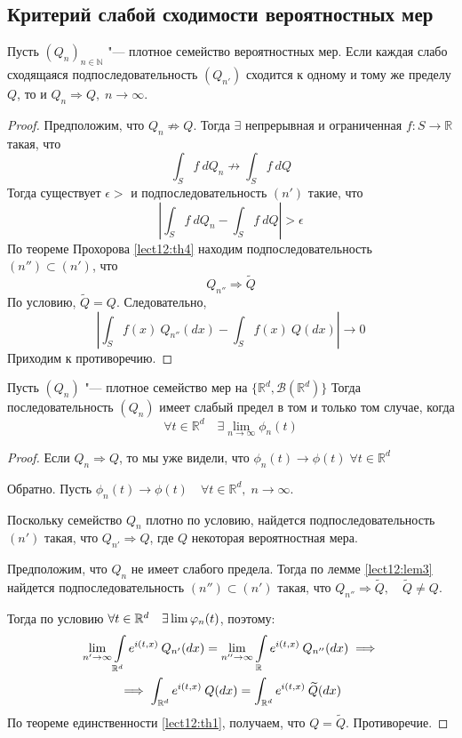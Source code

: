 \subsection{Критерий слабой сходимости вероятностных мер}
    \begin{lemma} \label{lect12:lem3}
        Пусть $(Q_n)_{n \in \mathbb{N}}$ "--- плотное семейство вероятностных мер. Если каждая слабо сходящаяся подпоследовательность $(Q_{n'})$ сходится к одному и тому же пределу $Q$, то и $Q_n \Rightarrow Q, \; n \to \infty$.
    \end{lemma}
    \begin{proof}
        Предположим, что $Q_n \not \Rightarrow Q$. Тогда $\exists$ непрерывная и ограниченная $f\colon S\to \mathbb{R}$ такая, что
        $$\int_S f \:dQ_n \not \to \int_S f \: dQ$$
        Тогда существует $\epsilon > $ и подпоследовательность $(n')$ такие, что
        $$\left| \int_S f\:dQ_n - \int_S f\: dQ\right| > \epsilon$$
        По теореме Прохорова \ref{lect12:th4} находим подпоследовательность $(n'') \subset (n')$, что
        $$Q_{n''} \Rightarrow \widetilde{Q}$$
        По условию, $\widetilde{Q} = Q$. Следовательно,
        $$\left|\int_S f(x) \:Q_{n''}(dx) - \int_S f(x)\:Q(dx) \right|\to 0$$
        Приходим к противоречию.
    \end{proof}
    \begin{lemma} \label{lect12:lem4}
        Пусть $(Q_n)$ "--- плотное семейство мер на $\{\mathbb{R}^d, \mathcal{B}(\mathbb{R}^d)\}$ Тогда последовательность $(Q_n)$ имеет слабый предел в том и только том случае, когда
        $$\forall t \in \mathbb{R}^d \quad\exists \lim_{n \to \infty} \phi_n(t)$$
    \end{lemma}
    \begin{proof}
        Если $Q_n \Rightarrow Q$, то мы уже видели, что $\phi_n(t) \to \phi(t)\; \forall t \in \mathbb{R}^d$

        Обратно. Пусть $\phi_n(t) \to \phi(t) \quad \forall t \in \mathbb{R}^d, \; n \to \infty$.

        Поскольку семейство $Q_n$ плотно по условию, найдется подпоследовательность $(n')$ такая, что $Q_{n'} \Rightarrow Q$, где $Q$ некоторая вероятностная мера.

        Предположим, что $Q_n$ не имеет слабого предела. Тогда по лемме \ref{lect12:lem3} найдется подпоследовательность $(n'')\subset (n')$ такая, что $Q_{n''} \Rightarrow\widetilde Q,\quad \widetilde Q \ne Q$.

        Тогда по условию $\forall t\in \mathbb{R}^d\quad \exists \lim \varphi_n(t)$, поэтому:
        \begin{gather*}
            \lim_{n' \to \infty} \int\limits_{\mathbb{R}^d} e^{i(t,x)} \:Q_{n'}(dx) = \lim_{n'' \to \infty} \int\limits_\mathbb{R} e^{i(t,x)} \:Q_{n''}(dx) \implies\\
            \implies \int_{\mathbb{R}^d} e^{i(t, x)}\: Q(dx) = \int_{\mathbb{R}^d} e^{i(t,x)}\: \widetilde Q(dx)
        \end{gather*}
        По теореме единственности \ref{lect12:th1}, получаем, что $Q = \widetilde Q$. Противоречие.
    \end{proof}

